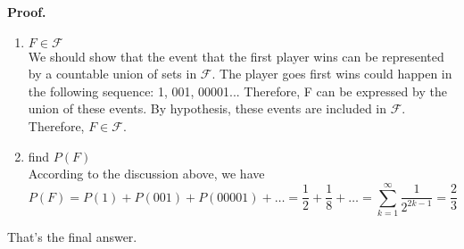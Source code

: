 \documentclass{article}
\begin{document}
    \textbf{Proof.}
    \begin{enumerate}
        \item \( F \in \mathcal{F} \) \\
        We should show that the event that the first player wins can be represented by a countable union of sets in \( \mathcal{F} \). The player goes first wins could happen in the following sequence: 1, 001, 00001... Therefore, F can be expressed by the union of these events. By hypothesis, these events are included in \( \mathcal{F} \). Therefore, \( F \in \mathcal{F} \).
        \item find \( P(F) \) \\
        According to the discussion above, we have 
        $$ P(F)=P(1)+P(001)+P(00001)+\dots=\frac{1}{2}+\frac{1}{8}+\dots=\sum_{k=1}^{\infty}\frac{1}{2^{2k-1}}=\frac{2}{3} $$
    \end{enumerate}
    That's the final answer.
\end{document}
